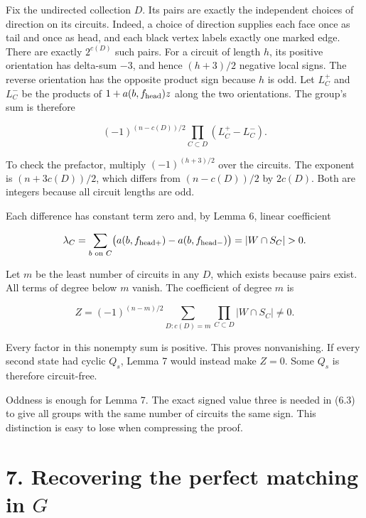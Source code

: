 \documentclass[a4paper,11pt]{amsart}
\begin{document}
Fix the undirected collection $D$. Its pairs are exactly the independent choices of direction on its circuits. Indeed, a choice of direction supplies each face once as tail and once as head, and each black vertex labels exactly one marked edge. There are exactly $2^{c(D)}$ such pairs. For a circuit of length $h$, its positive orientation has delta-sum $-3$, and hence $(h+3)/2$ negative local signs. The reverse orientation has the opposite product sign because $h$ is odd. Let $L_C^+$ and $L_C^-$ be the products of $1+a(b,\allowbreak f_{\rm head})z$ along the two orientations. The group's sum is therefore

\begin{equation*}
(-1)^{(n-c(D))/2}\prod_{C\subset D}(L_C^+-L_C^-).                 \tag{6.3}
\end{equation*}

To check the prefactor, multiply $(-1)^{(h+3)/2}$ over the circuits. The exponent is $(n+3c(D))/2$, which differs from $(n-c(D))/2$ by $2c(D)$. Both are integers because all circuit lengths are odd.

Each difference has constant term zero and, by Lemma 6, linear coefficient

\begin{equation*}
\lambda_C=\sum_{b\text{ on }C}\bigl(a(b,f_{\rm head+})-a(b,f_{\rm head-})\bigr)
=|W\cap S_C|>0.
\end{equation*}

Let $m$ be the least number of circuits in any $D$, which exists because pairs exist. All terms of degree below $m$ vanish. The coefficient of degree $m$ is

\begin{equation*}
[z^m]Z=(-1)^{(n-m)/2}\sum_{D:c(D)=m}\prod_{C\subset D}|W\cap S_C|\ne0.       \tag{6.4}
\end{equation*}

Every factor in this nonempty sum is positive. This proves nonvanishing. If every second state had cyclic $Q_s$, Lemma 7 would instead make $Z=0$. Some $Q_s$ is therefore circuit-free.

Oddness is enough for Lemma 7. The exact signed value three is needed in (6.3) to give all groups with the same number of circuits the same sign. This distinction is easy to lose when compressing the proof.

\section*{7. Recovering the perfect matching in $G$}
\end{document}

